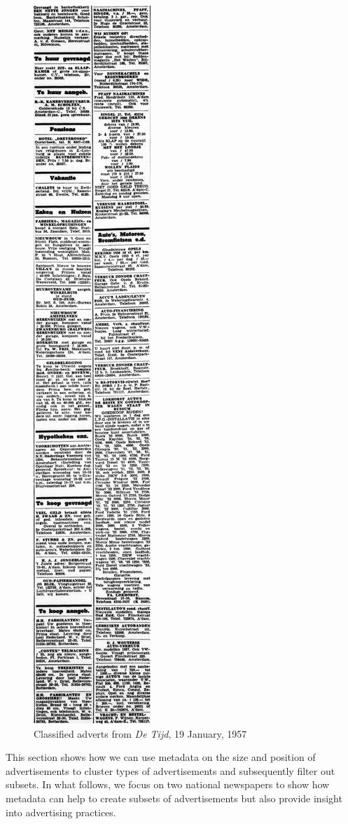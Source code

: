 \documentclass[USenglish]{article}
\begin{document}
\begin{figure}
  \vspace{-10mm}
  \begin{center}
    \includegraphics[height=0.30\textheight]{figures/classifieds}
  \end{center}
  \caption{Classified adverts from \textit{De Tijd}, 19 January, 1957}
  \vspace{-7mm}
  \label{fig:classifieds}
\end{figure}
%
This section shows how we can use metadata on the size and position of advertisements to cluster types of advertisements and subsequently filter out subsets. In what follows, we focus on two national newspapers to show how metadata can help to create subsets of advertisements but also provide insight into advertising practices. 
\end{document}
